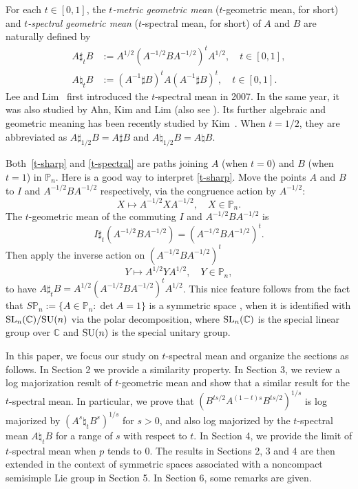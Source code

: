 \documentclass[12pt, reqno]{amsart}
\numberwithin{equation}{section}
\theoremstyle{definition}
\def\SU{{\rm SU}}
\def\SL{{\rm SL}}
\def\C{\mathbb C}
\def\P{\mathbb P}
\begin{document}
For each $t \in [0, 1]$, the {\it $t$-metric geometric mean} ($t$-geometric mean, for short) and {\it $t$-spectral geometric mean} ($t$-spectral mean, for short) of $A$ and $B$ are naturally defined by
\begin{align}
A \sharp_t B & := A^{1/2}(A^{-1/2}BA^{-1/2})^{t}A^{1/2}, \quad {t \in [0, 1]},\label{t-sharp}\\
A \natural_t B & := (A^{-1}\sharp B)^{t}A(A^{-1}\sharp B)^{t}, \quad {t \in [0, 1]}. \label{t-spectral}
\end{align}
Lee and Lim~\cite{LL07} first introduced the $t$-spectral mean in 2007. In the same year, it was also studied by Ahn, Kim and Lim \cite [p.191]{AKL07} (also see \cite [p.446]{KL07}). Its further algebraic and geometric meaning has been recently studied by Kim~\cite{Ki21}.
When $t = 1/2$, they are abbreviated as $A \sharp_{1/2} B = A \sharp B$ and $A \natural_{1/2} B = A \natural B$.

Both~\eqref{t-sharp} and \eqref{t-spectral} are paths joining $A$ {(when $t=0$) and $B$ (when $t=1$)} in $\P_n$. Here is a good way to interpret \eqref{t-sharp}. Move the points $A$ and $B$ to 
$I$ and $A^{-1/2}BA^{-1/2}$ respectively, via the congruence action by $A^{-1/2}$:
\[
X\mapsto A^{-1/2}XA^{-1/2},\quad  X\in \P_n .
\]
The $t$-geometric mean of the commuting $I$ and $A^{-1/2}BA^{-1/2}$ is \[I\sharp_t (A^{-1/2}BA^{-1/2})= (A^{-1/2}BA^{-1/2})^{t}.\] Then apply the inverse action on $(A^{-1/2}BA^{-1/2})^{t}$
\[
Y\mapsto A^{1/2}YA^{1/2},\quad  Y\in \P_n,
\]
to have $A \sharp_t B = A^{1/2}(A^{-1/2}BA^{-1/2})^{t}A^{1/2}$. This nice feature follows from  the fact that $S\P_n:=\{A\in \P_n: \det A=1\}$ is a symmetric space \cite [p.208-209]{He78}, when it is identified with $\SL_n(\C)/\SU(n)$ via the polar decomposition, where $\SL_n(\C)$ is the special linear group over $\C$ and $\SU(n)$ is the special unitary group.


In this paper, we focus our study on $t$-spectral mean and organize the sections as follows. In Section 2 we provide a similarity property. 
In Section 3, we review a log majorization result of $t$-geometric mean and show that a similar result for the $t$-spectral mean. In particular, we prove that $\left(B^{ts/2}A^{(1-t)s}B^{ts/2} \right)^{1/s}$ is log majorized by $(A^s\natural_tB^s)^{1/s}$ for $s>0$, and  also log majorized by the $t$-spectral mean $A\natural_tB$ for a range of $s$ with respect to $t$.
In Section 4, we provide the limit of $t$-spectral mean when $p$ tends to $0$.
The results in Sections 2, 3 and 4 are then extended in the context of symmetric spaces associated with a noncompact semisimple Lie group in Section 5.
In Section 6, some remarks are given.
\end{document}
